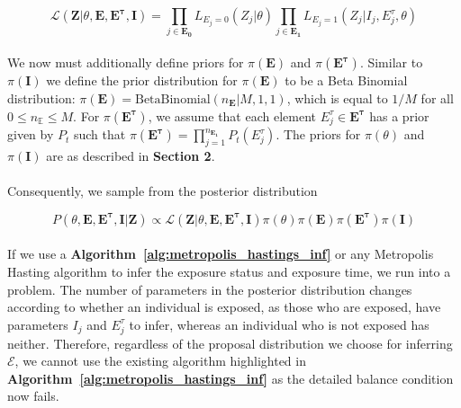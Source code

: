 \begin{equation}
\mathcal{L}(\mathbf{Z} | \theta, \mathbf{E}, \mathbf{E^\tau}, \mathbf{I}) = \prod_{j \in \mathbf{E_0}}L_{E_j = 0}(Z_{j}| \theta) \prod_{j \in \mathbf{E_1}}L_{E_j = 1}(Z_{j}| I_j, E_j^\tau, \theta) 
\end{equation}

\paragraph{}We now must additionally define priors for $\pi(\mathbf{E})$ and $\pi(\mathbf{E^{\tau}})$. Similar to $\pi(\mathbf{I})$ we define the prior distribution for  $\pi(\mathbf{E})$ to be a Beta Binomial distribution: $\pi(\mathbf{E}) = \text{BetaBinomial}(n_{\mathbf{E}}| M, 1, 1)$, which is equal to $1/M$ for all $0 \leq n_{\mathbb{E}} \leq M$. For $\pi(\mathbf{E^{\tau}})$, we assume that each element $E_j^\tau \in \mathbf{E^{\tau}}$ has a prior given by $P_t$ such that $\pi(\mathbf{E^{\tau}}) = \prod_{j = 1}^{n_\mathbf{E_1}} P_t(E_j^\tau)$. The priors for $\pi(\theta)$ and $\pi(\mathbf{I})$ are as described in \textbf{Section 2}. 

\paragraph{}Consequently, we sample from the posterior distribution

\begin{equation}
P(\theta, \mathbf{E}, \mathbf{E^\tau}, \mathbf{I} | \mathbf{Z}) \propto \mathcal{L}(\mathbf{Z} | \theta, \mathbf{E}, \mathbf{E^\tau}, \mathbf{I})\pi(\theta)\pi(\mathbf{E})\pi( \mathbf{E^\tau})\pi(\mathbf{I})
\end{equation}


\paragraph{}If we use a \textbf{Algorithm~\ref{alg:metropolis_hastings_inf}} or any Metropolis Hasting algorithm to infer the exposure status and exposure time, we run into a problem. The number of parameters in the posterior distribution changes according to whether an individual is exposed, as those who are exposed, have parameters $I_j$ and $E^\tau_j$ to infer, whereas an individual who is not exposed has neither. Therefore, regardless of the proposal distribution we choose for inferring $\mathcal{E}$, we cannot use the existing algorithm highlighted in \textbf{Algorithm~\ref{alg:metropolis_hastings_inf}} as the detailed balance condition now fails. 


